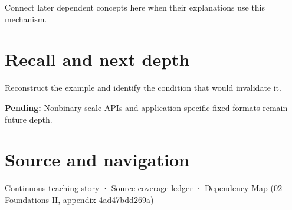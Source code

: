Connect later dependent concepts here when their explanations use this mechanism.

\section{Recall and next depth}\label{appendix-1d0dbe8924cc-recall-and-next-depth}

Reconstruct the example and identify the condition that would invalidate it.

\textbf{Pending:} Nonbinary scale APIs and application-specific fixed formats remain future depth.

\section{Source and navigation}\label{appendix-1d0dbe8924cc-source-and-navigation}

\href{Continuous\%20Notes/Computing\%20Foundations\%20-\%20From\%20Bits\%20to\%20C++\%20and\%20Systems\%20APIs\#Choosing\%20what\%20information\%20to\%20keep}{Continuous teaching story} · \hyperref[appendix-fd090d982a15]{Source coverage ledger} · \href{../02-Foundations-II/main.pdf\#nameddest=appendix-4ad47bdd269a}{Dependency Map (02-Foundations-II, appendix-4ad47bdd269a)}
